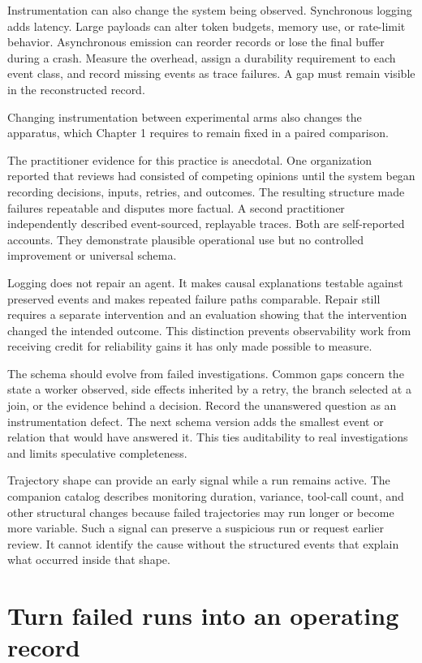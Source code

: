 Instrumentation can also change the system being observed. Synchronous logging adds latency. Large payloads can alter token budgets, memory use, or rate-limit behavior. Asynchronous emission can reorder records or lose the final buffer during a crash. Measure the overhead, assign a durability requirement to each event class, and record missing events as trace failures. A gap must remain visible in the reconstructed record.

Changing instrumentation between experimental arms also changes the apparatus, which Chapter 1 requires to remain fixed in a paired comparison.

The practitioner evidence for this practice is anecdotal. One organization reported that reviews had consisted of competing opinions until the system began recording decisions, inputs, retries, and outcomes. The resulting structure made failures repeatable and disputes more factual. A second practitioner independently described event-sourced, replayable traces. Both are self-reported accounts. They demonstrate plausible operational use but no controlled improvement or universal schema.

Logging does not repair an agent. It makes causal explanations testable against preserved events and makes repeated failure paths comparable. Repair still requires a separate intervention and an evaluation showing that the intervention changed the intended outcome. This distinction prevents observability work from receiving credit for reliability gains it has only made possible to measure.

The schema should evolve from failed investigations. Common gaps concern the state a worker observed, side effects inherited by a retry, the branch selected at a join, or the evidence behind a decision. Record the unanswered question as an instrumentation defect. The next schema version adds the smallest event or relation that would have answered it. This ties auditability to real investigations and limits speculative completeness.

Trajectory shape can provide an early signal while a run remains active. The companion catalog describes monitoring duration, variance, tool-call count, and other structural changes because failed trajectories may run longer or become more variable. Such a signal can preserve a suspicious run or request earlier review. It cannot identify the cause without the structured events that explain what occurred inside that shape.

\hypertarget{turn-failed-runs-into-an-operating-record}{%
\section{Turn failed runs into an operating record}\label{turn-failed-runs-into-an-operating-record}}

